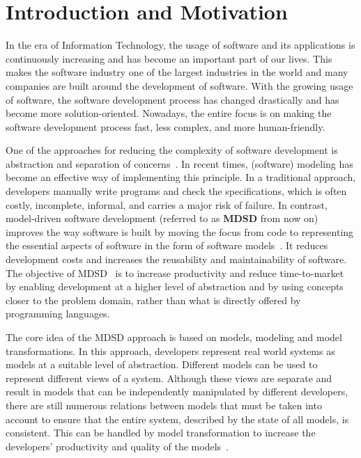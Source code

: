 \section{Introduction and Motivation}\label{sec:introduction}
In the era of Information Technology, the usage of software and its applications is continuously increasing and has become an important part of our lives. This makes the software industry one of the largest industries in the world and many companies are built around the development of software. With the growing usage of software, the software development process has changed drastically and has become more solution-oriented. Nowadays, the entire focus is on making the software development process fast, less complex, and more human-friendly. 

One of the approaches for reducing the complexity of software development is abstraction and separation of concerns~\cite{modeltransform}. In recent times, (software) modeling has become an effective way of implementing this principle. In a traditional approach, developers manually write programs and check the specifications, which is often costly, incomplete, informal, and carries a major risk of failure. In contrast, model-driven software development (referred to as \textbf{MDSD} from now on) improves the way software is built by moving the focus from code to representing the essential aspects of software in the form of software models~\cite{modeltransform}. It reduces development costs and increases the reusability and maintainability of software. The objective of MDSD~\cite{modeltransform} is to increase productivity and reduce time-to-market by enabling development at a higher level of abstraction and by using concepts closer to the problem domain, rather than what is directly offered by programming languages.
 
The core idea of the MDSD approach is based on models, modeling and model transformations. In this approach, developers represent real world systems as models at a suitable level of abstraction. Different models can be used to represent different views of a system.  Although these views are separate and result in models that can be independently manipulated by different developers, there are still numerous relations between models that must be taken into account to ensure that the entire system, described by the state of all models, is consistent. This can be handled by model transformation to increase the developers' productivity and quality of the models~\cite{mdsd}.

